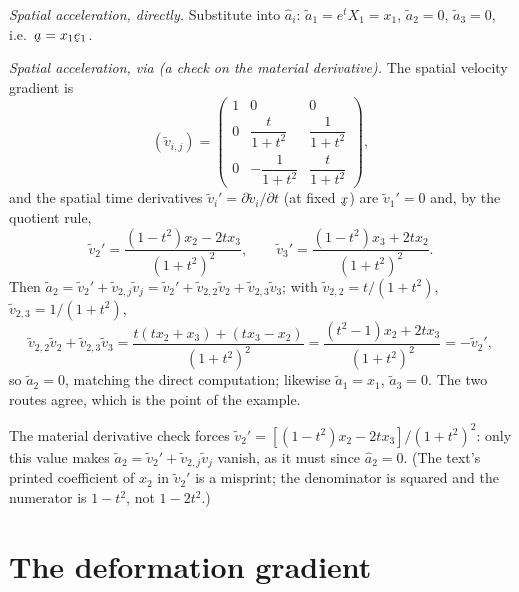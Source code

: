 \begin{example}
\emph{Spatial acceleration, directly.} Substitute  into $\hat a_i$:
$\tilde a_1=e^{t}X_1=x_1$, $\tilde a_2=0$, $\tilde a_3=0$, i.e.\
$\ba=x_1\be_1$.

\emph{Spatial acceleration, via  (a check on the material
derivative).} The spatial velocity gradient is
\begin{equation}
   (\tilde v_{i,j})=\begin{pmatrix}
   1&0&0\\[1mm]
   0&\dfrac{t}{1+t^2}&\dfrac{1}{1+t^2}\\[2mm]
   0&-\dfrac{1}{1+t^2}&\dfrac{t}{1+t^2}\end{pmatrix}, \tag{2.33}\label{eq:2.33}
\end{equation}
and the spatial time derivatives $\tilde v_i'=\partial\tilde v_i/\partial t$
(at fixed $\bx$) are $\tilde v_1'=0$ and, by the quotient rule,
\begin{equation}
   \tilde v_2'=\frac{(1-t^2)x_2-2t x_3}{(1+t^2)^2},\qquad
   \tilde v_3'=\frac{(1-t^2)x_3+2t x_2}{(1+t^2)^2}. \tag{2.32}\label{eq:2.32}
\end{equation}
Then $\tilde a_2=\tilde v_2'+\tilde v_{2,j}\tilde v_j
=\tilde v_2'+\tilde v_{2,2}\tilde v_2+\tilde v_{2,3}\tilde v_3$; with
$\tilde v_{2,2}=t/(1+t^2)$, $\tilde v_{2,3}=1/(1+t^2)$,
\[
   \tilde v_{2,2}\tilde v_2+\tilde v_{2,3}\tilde v_3
   =\frac{t(tx_2+x_3)+(tx_3-x_2)}{(1+t^2)^2}
   =\frac{(t^2-1)x_2+2t x_3}{(1+t^2)^2}
   =-\tilde v_2' ,
\]
so $\tilde a_2=0$, matching the direct computation; likewise $\tilde a_1=x_1$,
$\tilde a_3=0$. The two routes agree, which is the point of the example.
\end{example}

\begin{remark}\label{rem:v2prime}
The material derivative check forces
$\tilde v_2'=[(1-t^2)x_2-2t x_3]/(1+t^2)^2$: only this value makes
$\tilde a_2=\tilde v_2'+\tilde v_{2,j}\tilde v_j$ vanish, as it must since
$\hat a_2=0$. (The text's printed coefficient of $x_2$ in $\tilde v_2'$ is a
misprint; the denominator is squared and the numerator is $1-t^2$, not
$1-2t^2$.)
\end{remark}

\section{The deformation gradient}\label{sec:defgrad}

